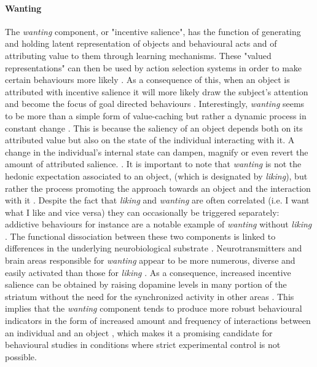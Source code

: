 \paragraph*{Wanting}
\label{wanting}
The \emph{wanting} component, or "incentive salience", has the function of generating and holding latent representation of objects and behavioural acts and of attributing value to them through learning mechanisms. These "valued representations" can then be used by action selection systems in order to make certain behaviours more likely \cite{ikemoto1996dissociations,berridge1998role,mcclure2003computational,berridge2004motivation}. As a consequence of this, when an object is attributed with incentive salience it will more likely draw the subject's attention and become the focus of goal directed behaviours \cite{berridge2004motivation}. Interestingly, \emph{wanting} seems to be more than a simple form of value-caching but rather a dynamic process in constant change \cite{robinson1993neural,zhang2009neural,tindell2009dynamic,berridge2012prediction}. This is because the saliency of an object depends both on its attributed value but also on the state of the individual interacting with it. A change in the individual's internal state can dampen, magnify or even revert the amount of attributed salience. \cite{robinson1993neural,zhang2009neural,tindell2009dynamic,berridge2012prediction}. It is important to note that \emph{wanting} is not the hedonic expectation associated to an object, (which is designated by \emph{liking}), but rather the process promoting the approach towards an object and the interaction with it \cite{berridge2009dissecting,robinson2015roles}. Despite the fact that \emph{liking} and \emph{wanting} are often correlated (i.e. I want what I like and vice versa) they can occasionally be triggered separately: addictive behaviours for instance are a notable example of \emph{wanting} without \emph{liking} \cite{robinson1993neural}. The functional dissociation between these two components is linked to differences in the underlying neurobiological substrate \cite{berridge2009dissecting,smith2011disentangling}. Neurotransmitters and brain areas responsible for \emph{wanting} appear to be more numerous, diverse and easily activated than those for \emph{liking} \cite{berridge2009dissecting,robinson2015roles}. As a consequence, increased incentive salience can be obtained by raising dopamine levels in many portion of the striatum without the need for the synchronized activity in other areas \cite{berridge2009dissecting,smith2011disentangling,meyer2015motivational}. This implies that the \emph{wanting} component tends to produce more robust behavioural indicators in the form of increased amount and frequency of interactions between an individual and an object \cite{berridge1998role}, which makes it a promising candidate for behavioural studies in conditions where strict experimental control is not possible.

